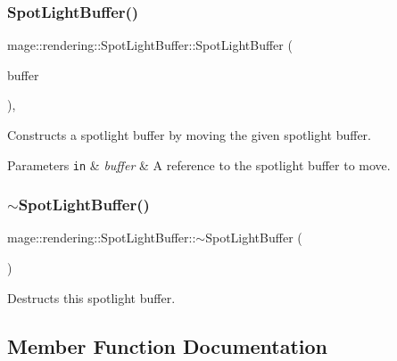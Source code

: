 \subsubsection{\texorpdfstring{Spot\+Light\+Buffer()}{SpotLightBuffer()}\hspace{0.1cm}{\footnotesize\ttfamily [3/3]}}
{\footnotesize\ttfamily mage\+::rendering\+::\+Spot\+Light\+Buffer\+::\+Spot\+Light\+Buffer (\begin{DoxyParamCaption}\item[{\mbox{\hyperlink{structmage_1_1rendering_1_1_spot_light_buffer}{Spot\+Light\+Buffer}} \&\&}]{buffer }\end{DoxyParamCaption})\hspace{0.3cm}{\ttfamily [default]}, {\ttfamily [noexcept]}}

Constructs a spotlight buffer by moving the given spotlight buffer.


\begin{DoxyParams}[1]{Parameters}
\mbox{\tt in}  & {\em buffer} & A reference to the spotlight buffer to move. \\
\hline
\end{DoxyParams}
\mbox{\label{structmage_1_1rendering_1_1_spot_light_buffer_ab1fecb64be60d395b0bc5d3e6cc4072a}} 
\subsubsection{\texorpdfstring{$\sim$\+Spot\+Light\+Buffer()}{~SpotLightBuffer()}}
{\footnotesize\ttfamily mage\+::rendering\+::\+Spot\+Light\+Buffer\+::$\sim$\+Spot\+Light\+Buffer (\begin{DoxyParamCaption}{ }\end{DoxyParamCaption})\hspace{0.3cm}{\ttfamily [default]}}

Destructs this spotlight buffer. 

\subsection{Member Function Documentation}
\mbox{\label{structmage_1_1rendering_1_1_spot_light_buffer_a6bfd4e7dc9b8a7d3cd5206c9becb91cf}} 
